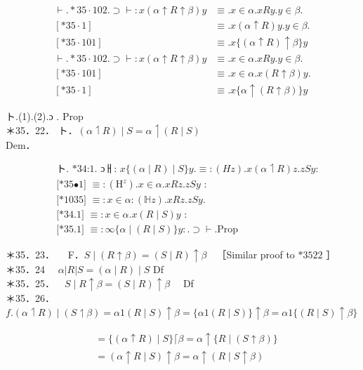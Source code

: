 \documentclass[10pt]{article}
\begin{document}
\[
\begin{array}{ll}
\vdash . * 35 \cdot 102 . \supset \vdash: x(\alpha \uparrow R \uparrow \beta) y & \equiv . x \in \alpha . x R y . y \in \beta . \\
{[* 35 \cdot 1]} & \equiv . x(\alpha \uparrow R) y . y \in \beta . \\
{[* 35 \cdot 101]} & \equiv . x\{(\alpha \uparrow R) \uparrow \beta\} y \\
\vdash . * 35 \cdot 102 . \supset \vdash: x(\alpha \uparrow R \uparrow \beta) y & \equiv . x \in \alpha . x R y . y \in \beta . \\
{[* 35 \cdot 101]} & \equiv . x \in \alpha . x(R \uparrow \beta) y . \\
{[* 35 \cdot 1]} & \equiv . x\{\alpha \uparrow(R \uparrow \beta)\} y \tag{2}
\end{array}
\]

ト.(1).(2).ɔ . Prop\\
＊35．22． ト．$(\alpha \upharpoonleft R) \mid S=\alpha \upharpoonleft(R \mid S)$\\
Dem．

$$
\begin{aligned}
& \text { ト. *34:1. ɔㅐ: } x\{(\alpha \mid R) \mid S\} y . \equiv:(H z) . x(\alpha \upharpoonleft R) z . z S y: \\
& \text { [*35•1] } \equiv:\left(\mathrm{H}^{z}\right) . x \in \alpha . x R z . z S y \text { : } \\
& \text { [*1035] } \equiv: x \in \alpha:(\mathbb{H} z) . x R z . z S y \text {. } \\
& \text { [*34.1] } \equiv: x \in \alpha . x(R \mid S) y \text { : } \\
& \text { [*35.1] } \equiv: \infty\{\alpha \mid(R \mid S)\} y: . \supset \vdash \text {.Prop }
\end{aligned}
$$

＊35．23．$\quad$ F．$S \mid(R \uparrow \beta)=(S \mid R) \uparrow \beta \quad$［Similar proof to $* 3522$ ］\\
＊35．24 $\quad \alpha|R| S=(\alpha \mid R) \mid S$ Df\\
＊35．25．$\quad S \mid R \uparrow \beta=(S \mid R) \uparrow \beta \quad$ Df\\
＊35．26．$f .(\alpha \upharpoonleft R) \mid(S \upharpoonleft \beta)=\alpha 1(R \mid S) \uparrow \beta=\{\alpha 1(R \mid S)\} \uparrow \beta=\alpha 1\{(R \mid S) \uparrow \beta\}$

$$
\begin{aligned}
& =\{(\alpha \uparrow R) \mid S\}\lceil\beta=\alpha \uparrow\{R \mid(S \uparrow \beta)\} \\
& =(\alpha \uparrow R \mid S) \uparrow \beta=\alpha \uparrow(R \mid S \uparrow \beta)
\end{aligned}
$$
\end{document}
